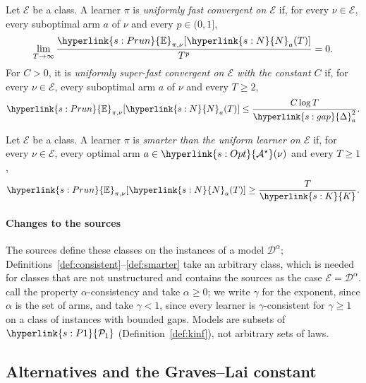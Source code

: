 \documentclass[11pt]{article}
\newcommand{\E}{\mathbb{E}}
\newcommand{\dt}[1]{\hypertarget{#1}{}}
\newcommand{\sy}[2]{{\hyperlink{#1}{#2}}}
\newcommand{\Pone}{\sy{s:P1}{\mathcal{P}_{1}}}
\newcommand{\Karms}{\sy{s:K}{K}}
\newcommand{\gap}{\sy{s:gap}{\Delta}}
\newcommand{\Opt}{\sy{s:Opt}{\mathcal{A}^{\star}}}
\newcommand{\Er}{\sy{s:Prun}{\E}}
\newcommand{\Np}{\sy{s:N}{N}}
\begin{document}
\begin{definition}\label{def:ufc}
Let $\mathcal E$ be a class. \dt{w:ufc}A learner $\pi$ is \emph{uniformly fast convergent on
$\mathcal E$} if, for every $\nu\in\mathcal E$, every suboptimal arm $a$ of $\nu$ and every
$p\in(0,1]$,
\begin{equation*}
  \lim_{T\to\infty}\frac{\Er_{\pi,\nu}[\Np_a(T)]}{T^p}=0.
\end{equation*}
\dt{w:usfc}For $C>0$, it is \emph{uniformly super-fast convergent on $\mathcal E$ with the constant
$C$} if, for every $\nu\in\mathcal E$, every suboptimal arm $a$ of $\nu$ and every $T\ge2$,
\begin{equation*}
  \Er_{\pi,\nu}[\Np_a(T)]\le\frac{C\log T}{\gap_a^2}.
\end{equation*}
\end{definition}

\begin{definition}\label{def:smarter}
Let $\mathcal E$ be a class. \dt{w:smart}A learner $\pi$ is \emph{smarter than the uniform learner
on $\mathcal E$} if, for every $\nu\in\mathcal E$, every optimal arm $a\in\Opt(\nu)$ and every
$T\ge1$,
\begin{equation*}
  \Er_{\pi,\nu}[\Np_a(T)]\ge\frac{T}{\Karms}.
\end{equation*}
\end{definition}

\paragraph{Changes to the sources} The sources define these classes on the instances of a model
$\mathcal D^\alpha$; Definitions~\ref{def:consistent}--\ref{def:smarter} take an arbitrary class,
which is needed for classes that are not unstructured and contains the sources as the case
$\mathcal E=\mathcal D^\alpha$. \citet[Definition~5]{SAE13} call the property $\alpha$-consistency and take $\alpha\ge0$; we write
$\gamma$ for the exponent, since $\alpha$ is the set of arms, and take $\gamma<1$, since every
learner is $\gamma$-consistent for $\gamma\ge1$ on a class of instances with bounded gaps. Models are
subsets of $\Pone$ (Definition~\ref{def:kinf}), not arbitrary sets of laws.

\subsection{Alternatives and the Graves--Lai constant}
\end{document}
